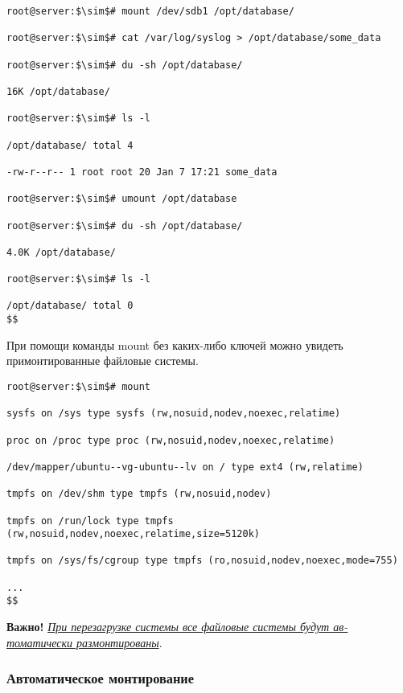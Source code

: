 \documentclass[14pt, a4paper]{article}
\begin{document}
\vspace{0.3cm}
\begin{lstlisting}[mathescape=true]
root@server:$\sim$# mount /dev/sdb1 /opt/database/

root@server:$\sim$# cat /var/log/syslog > /opt/database/some_data

root@server:$\sim$# du -sh /opt/database/

16K /opt/database/

root@server:$\sim$# ls -l

/opt/database/ total 4

-rw-r--r-- 1 root root 20 Jan 7 17:21 some_data

root@server:$\sim$# umount /opt/database

root@server:$\sim$# du -sh /opt/database/

4.0K /opt/database/

root@server:$\sim$# ls -l

/opt/database/ total 0
$$
\end{lstlisting}
\vspace{0.2cm}

При помощи команды \colorbox{backcolour}{mount} без каких-либо ключей можно увидеть примонтированные файловые
системы.

\begin{lstlisting}[mathescape=true]
root@server:$\sim$# mount

sysfs on /sys type sysfs (rw,nosuid,nodev,noexec,relatime)

proc on /proc type proc (rw,nosuid,nodev,noexec,relatime)

/dev/mapper/ubuntu--vg-ubuntu--lv on / type ext4 (rw,relatime)

tmpfs on /dev/shm type tmpfs (rw,nosuid,nodev)

tmpfs on /run/lock type tmpfs (rw,nosuid,nodev,noexec,relatime,size=5120k)

tmpfs on /sys/fs/cgroup type tmpfs (ro,nosuid,nodev,noexec,mode=755)

...
$$
\end{lstlisting}

\vspace{0.2cm}

\textbf{Важно!} \underline{\textit{При перезагрузке системы все файловые системы будут ав-}} \\
\underline{\textit{томатически размонтированы}}.

\subsubsection*{Автоматическое монтирование} 
\end{document}
